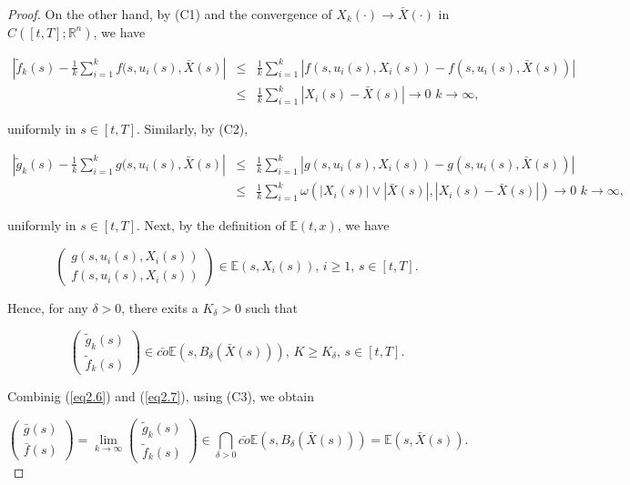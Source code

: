 \begin{proof}
On the other hand, by (C1) and the convergence of $X_k(\cdot)\rightarrow \bar{X}(\cdot)$ in $C([t,T];\mathbb{R}^n)$, we have

\begin{eqnarray*}
|\tilde{f}_k(s)-\frac{1}{k}\sum_{i=1}^{k}f(s,u_i(s),\bar{X}(s)|&\leq& \frac{1}{k}\sum_{i=1}^{k}|f(s,u_i(s),X_i(s))-f(s,u_i(s),\bar{X}(s))|\\
&\leq&\frac{1}{k}\sum_{i=1}^{k}|X_i(s)-\bar{X}(s)|\rightarrow 0\,\,k\rightarrow \infty,
\end{eqnarray*}

uniformly in $s\in [t,T]$. Similarly, by (C2),

\begin{eqnarray*}
	|\tilde{g}_k(s)-\frac{1}{k}\sum_{i=1}^{k}g(s,u_i(s),\bar{X}(s)|&\leq& \frac{1}{k}\sum_{i=1}^{k}|g(s,u_i(s),X_i(s))-g(s,u_i(s),\bar{X}(s))|\\
	&\leq&\frac{1}{k}\sum_{i=1}^{k}\omega(|X_i(s)|\vee |\bar{X}(s)|,|X_i(s)-\bar{X}(s)|)\rightarrow 0\,\,k\rightarrow \infty,
\end{eqnarray*}

uniformly in $s\in [t,T]$. Next, by the definition of $\mathbb{E}(t,x)$, we have

$$\begin{pmatrix}
	g(s,u_i(s),X_i(s)) \\ f(s,u_i(s),X_i(s))
\end{pmatrix} \in \mathbb{E}(s,X_i(s)),\,i\geq 1,\, s\in [t,T].$$

Hence, for any $\delta>0$, there exits a $K_{\delta}>0$ such that 

\begin{equation}\label{eq2.7}
	\begin{pmatrix}
		\tilde{g}_k(s) \\ \tilde{f}_k(s)
	\end{pmatrix}\in \bar{co}\mathbb{E}(s,B_{\delta}(\bar{X}(s))),\, K\geq K_{\delta},\, s\in[t,T].
\end{equation}

Combinig (\ref{eq2.6}) and (\ref{eq2.7}), using (C3), we obtain

\begin{equation*}
\begin{pmatrix}
\bar{g}(s) \\ \bar{f}(s)
\end{pmatrix}=\lim_{k\rightarrow \infty}\begin{pmatrix}
\tilde{g}_k(s) \\ \tilde{f}_k(s)
\end{pmatrix}\in \bigcap_{\delta>0}\bar{co}\mathbb{E}(s,B_{\delta}(\bar{X}(s)))=\mathbb{E}(s,\bar{X}(s)).
\end{equation*}


\end{proof}
